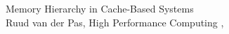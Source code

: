 \documentclass[%
	final,
	notitlepage,
	narroweqnarray,
	inline,
	twoside,
	]{ieee}
\begin{document}


\begin{thebibliography}{1}

\newblock Memory Hierarchy in Cache-Based Systems\\ Ruud van der Pas, High Performance Computing
,


\end{thebibliography}

\end{document}
